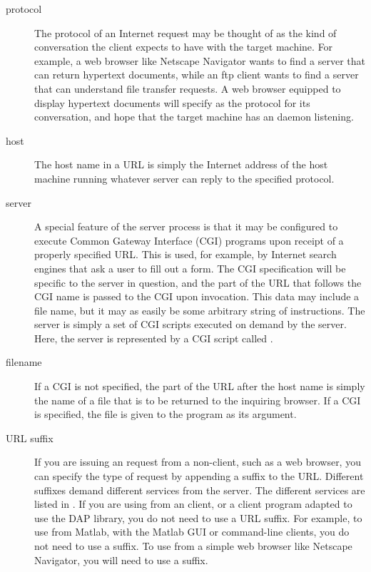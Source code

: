 \begin{description}

\item[protocol] 
  The protocol of an Internet request may be thought of as the kind
  of conversation the client expects to have with the target machine.
  For example, a web browser like Netscape Navigator wants to find
  a server that can return hypertext documents, while an ftp client
  wants to find a server that can understand file transfer requests. A
  web browser equipped to display hypertext documents will specify
   as the protocol for its conversation, and hope that the target
  machine has an  daemon listening.
  
\item[host] The host name in a URL is simply the
  Internet address of the host machine running whatever server can
  reply to the specified protocol.
  
\item[server] A special feature of the  server process is
  that it may be configured to execute Common Gateway Interface (CGI)
  programs   upon
  receipt of a properly specified URL. This is used, for example, by
  Internet search engines that ask a user to fill out a form. The CGI
  specification will be specific to the server in question, and the
  part of the URL that follows the CGI name is passed to the CGI upon
  invocation. This data may include a file name, but it may as easily
  be some arbitrary string of instructions. The \opendap server is simply
  a set of CGI scripts executed on demand by the  server.
  Here, the \opendap server is represented by a CGI script called
  .
  
\item[filename]  If a CGI is not
  specified, the part of the URL after the host name is simply the
  name of a file that is to be returned to the inquiring browser.  If
  a CGI is specified, the file is given to the program as its
  argument.

\item[URL suffix]  If you are issuing an \opendap request
  from a non-\opendap client, such as a web browser, you can specify the
  type of request by appending a suffix to the URL.  Different
  suffixes demand different services from the server.  The different
  services are listed in .  If you
  are using \opendap from an \opendap client, or a client program adapted to
  use the \opendap DAP library, you do not need to use a URL suffix.  For
  example, to use \opendap from Matlab, with the Matlab GUI or
  command-line clients, you do not need to use a suffix.  To use \opendap
  from a simple web browser like Netscape Navigator, you will need to
  use a suffix.

\end{description}

